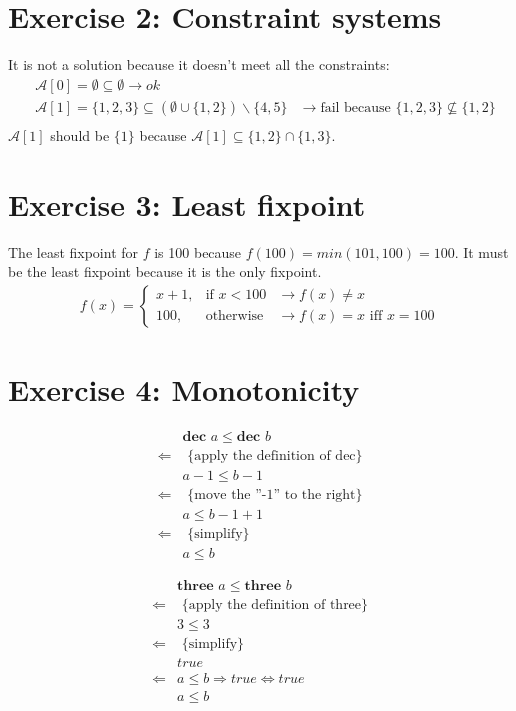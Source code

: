 \documentclass[11pt,a4paper]{scrartcl}
\begin{document}
\section*{Exercise 2: Constraint systems}
It is not a solution because it doesn't meet all the constraints:
\begin{align*}
&\mathcal{A}[0] = \emptyset \subseteq \emptyset \rightarrow ok\\
&\mathcal{A}[1] = \{1,2,3\} \subseteq (\emptyset \cup \{1,2\}) \backslash \{4,5\} &\rightarrow \mbox{fail because } \{1,2,3\} \nsubseteq \{1,2\}\\
\end{align*}
$\mathcal{A}[1]$ should be $\{1\}$ because $\mathcal{A}[1] \subseteq \{1,2\} \cap \{1,3\}$.

\section*{Exercise 3: Least fixpoint}
The least fixpoint for $f$ is 100 because $f(100) = min(101,100) = 100$. It must be the least fixpoint because it is the only fixpoint.
\begin{align*}
f(x) = \left\{ \begin{array}{lcl}
x+1, &\mbox{if } x<100 &\rightarrow f(x) \neq x\\
100, &\mbox{otherwise} &\rightarrow f(x) = x \mbox{ iff } x = 100
\end{array}\right.
\end{align*}


\section*{Exercise 4: Monotonicity}
\begin{align*}
&\textbf{dec }a \leq \textbf{dec }b\\
\Leftarrow &\text{ \{apply the definition of dec\}}\\
&a-1 \leq b-1\\
\Leftarrow &\text{ \{move the ''-1'' to the right\}}\\
&a \leq b-1+1\\
\Leftarrow &\text{ \{simplify\}}\\
&a \leq b
\end{align*}

\begin{align*}
&\textbf{three }a \leq \textbf{three }b\\
\Leftarrow &\text{ \{apply the definition of three\}}\\
&3 \leq 3\\
\Leftarrow &\text{ \{simplify\}}\\
&true\\
\Leftarrow &a \leq b \Rightarrow true \Leftrightarrow true\\
&a \leq b
\end{align*}
\end{document}
